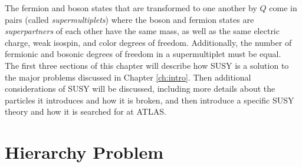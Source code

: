 The fermion and boson states that are transformed to one another by $Q$ come in pairs (called \textit{supermultiplets}) where the boson and fermion states are \textit{superpartners} of each other have the same mass, as well as the same electric charge, weak isospin, and color degrees of freedom.  Additionally, the number of fermionic and bosonic degrees of freedom in a supermultiplet must be equal. \\ %





The first three sections of this chapter will describe how SUSY is a solution to the major problems discussed in Chapter \ref{ch:intro}.  Then additional considerations of SUSY will be discussed, including more details about the particles it introduces and how it is broken, and then introduce a specific SUSY theory and how it is searched for at ATLAS.


\section{Hierarchy Problem}%

